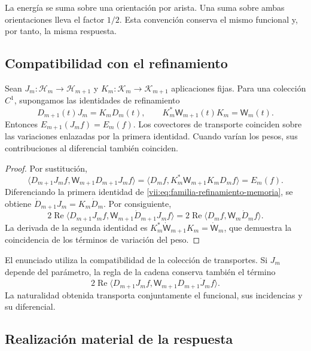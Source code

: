 La energía se suma sobre una orientación por arista. Una suma sobre ambas
orientaciones lleva el factor \(1/2\). Esta convención conserva el mismo
funcional y, por tanto, la misma respuesta.

\subsection{Compatibilidad con el refinamiento}
\label{vii:subsec:refinamiento-respuesta}

\begin{theorem}
\label{vii:thm:refinamiento-respuesta}
Sean \(J_m:\mathcal H_m\to\mathcal H_{m+1}\) y
\(K_m:\mathcal K_m\to\mathcal K_{m+1}\) aplicaciones fijas.
Para una colección \(C^1\), supongamos las identidades de refinamiento
\begin{equation}
 D_{m+1}(t)J_m=K_mD_m(t),\qquad
 K_m^*\mathsf W_{m+1}(t)K_m=\mathsf W_m(t).
 \label{vii:eq:familia-refinamiento-memoria}
\end{equation}
Entonces \(E_{m+1}(J_mf)=E_m(f)\).
Los covectores de transporte coinciden sobre las variaciones enlazadas
por la primera identidad. Cuando varían los pesos, sus contribuciones
al diferencial también coinciden.
\end{theorem}

\begin{proof}
Por sustitución,
\[
 \langle D_{m+1}J_mf,\mathsf W_{m+1}D_{m+1}J_mf\rangle
 =\langle D_mf,K_m^*\mathsf W_{m+1}K_mD_mf\rangle=E_m(f).
\]
Diferenciando la primera identidad de
\eqref{vii:eq:familia-refinamiento-memoria}, se obtiene
\(\dot D_{m+1}J_m=K_m\dot D_m\). Por consiguiente,
\[
 2\operatorname{Re}
 \langle D_{m+1}J_mf,\mathsf W_{m+1}\dot D_{m+1}J_mf\rangle
 =2\operatorname{Re}\langle D_mf,\mathsf W_m\dot D_mf\rangle.
\]
La derivada de la segunda identidad es
\(K_m^*\dot{\mathsf W}_{m+1}K_m=\dot{\mathsf W}_m\), que demuestra
la coincidencia de los términos de variación del peso.
\end{proof}

El enunciado utiliza la compatibilidad de la colección de transportes.
Si \(J_m\) depende del parámetro, la regla de la cadena conserva
también el término
\[
 2\operatorname{Re}
 \langle D_{m+1}J_mf,\mathsf W_{m+1}D_{m+1}\dot J_mf\rangle.
\]
La naturalidad obtenida transporta conjuntamente el funcional, sus
incidencias y su diferencial.

\subsection{Realización material de la respuesta}
\label{vii:subsec:realizacion-respuesta-discreta}

